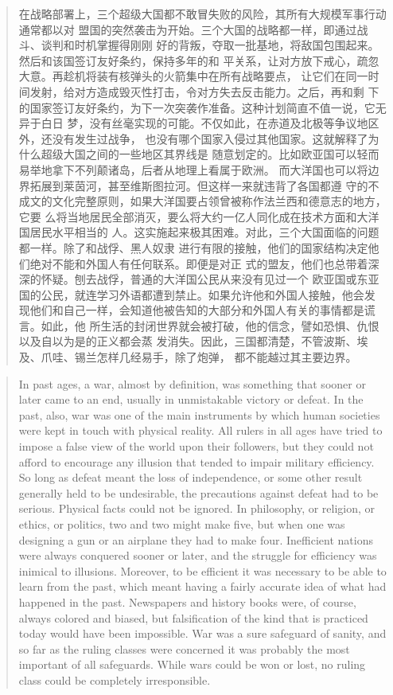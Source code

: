 \begin{paracol}{2}
\switchcolumn

\begin{quotation}
在战略部署上，三个超级大国都不敢冒失败的风险，其所有大规模军事行动通常都以对
盟国的突然袭击为开始。三个大国的战略都一样，即通过战斗、谈判和时机掌握得刚刚
好的背叛，夺取一批基地，将敌国包围起来。然后和该国签订友好条约，保持多年的和
平关系，让对方放下戒心，疏忽大意。再趁机将装有核弹头的火箭集中在所有战略要点，
让它们在同一时间发射，给对方造成毁灭性打击，令对方失去反击能力。之后，再和剩
下的国家签订友好条约，为下一次突袭作准备。这种计划简直不值一说，它无异于白日
梦，没有丝毫实现的可能。不仅如此，在赤道及北极等争议地区外，还没有发生过战争，
也没有哪个国家入侵过其他国家。这就解释了为什么超级大国之间的一些地区其界线是
随意划定的。比如欧亚国可以轻而易举地拿下不列颠诸岛，后者从地理上看属于欧洲。
而大洋国也可以将边界拓展到莱茵河，甚至维斯图拉河。但这样一来就违背了各国都遵
守的不成文的文化完整原则，如果大洋国要占领曾被称作法兰西和德意志的地方，它要
么将当地居民全部消灭，要么将大约一亿人同化成在技术方面和大洋国居民水平相当的
人。这实施起来极其困难。对此，三个大国面临的问题都一样。除了和战俘、黑人奴隶
进行有限的接触，他们的国家结构决定他们绝对不能和外国人有任何联系。即便是对正
式的盟友，他们也总带着深深的怀疑。刨去战俘，普通的大洋国公民从来没有见过一个
欧亚国或东亚国的公民，就连学习外语都遭到禁止。如果允许他和外国人接触，他会发
现他们和自己一样，会知道他被告知的大部分和外国人有关的事情都是谎言。如此，他
所生活的封闭世界就会被打破，他的信念，譬如恐惧、仇恨以及自以为是的正义都会蒸
发消失。因此，三国都清楚，不管波斯、埃及、爪哇、锡兰怎样几经易手，除了炮弹，
都不能越过其主要边界。
\end{quotation}

\switchcolumn*

\begin{quotation}
In past ages, a war, almost by definition, was something that sooner or
later came to an end, usually in unmistakable victory or defeat. In the
past, also, war was one of the main instruments by which human societies
were kept in touch with physical reality. All rulers in all ages have
tried to impose a false view of the world upon their followers, but they
could not afford to encourage any illusion that tended to impair
military efficiency. So long as defeat meant the loss of independence,
or some other result generally held to be undesirable, the precautions
against defeat had to be serious. Physical facts could not be ignored.
In philosophy, or religion, or ethics, or politics, two and two might
make five, but when one was designing a gun or an airplane they had to
make four. Inefficient nations were always conquered sooner or later,
and the struggle for efficiency was inimical to illusions. Moreover, to
be efficient it was necessary to be able to learn from the past, which
meant having a fairly accurate idea of what had happened in the past.
Newspapers and history books were, of course, always colored and biased,
but falsification of the kind that is practiced today would have been
impossible. War was a sure safeguard of sanity, and so far as the ruling
classes were concerned it was probably the most important of all
safeguards. While wars could be won or lost, no ruling class could be
completely irresponsible.
\end{quotation}


\end{paracol}
